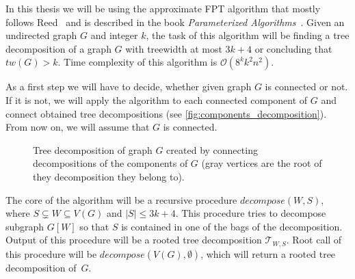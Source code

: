 \documentclass[thesis=B,english]{FITthesis}[2019/03/21]
\begin{document}
In this thesis we will be using the approximate FPT algorithm that mostly follows Reed~\cite{tree_decomposition_algorithm} and is described in the book \emph{Parameterized Algorithms}~\cite[Chap. 7.6.2]{param_algo}. Given an undirected graph $G$ and integer $k$, the task of this algorithm will be finding a tree decomposition of a graph $G$ with treewidth at most $3k+4$ or concluding that $tw(G) > k$. Time complexity of this algorithm is $\mathcal{O}(8^k k^2 n^2)$.

As a first step we will have to decide, whether given graph $G$ is connected or not. If it is not, we will apply the algorithm to each connected component of $G$ and connect obtained tree decompositions (see \autoref{fig:components_decomposition}). From now on, we will assume that $G$ is connected.

\begin{figure}[H]
	\centering
	\hspace{1em}
	\caption[Tree decomposition of a graph $G$ created by connecting decompositions of the components of $G$]{Tree decomposition of graph $G$ created by connecting decompositions of the components of $G$ (gray vertices are the root of they decomposition they belong to).}
	\label{fig:components_decomposition}
\end{figure}

The core of the algorithm will be a recursive procedure $decompose(W,S)$, where $S \subsetneq W \subseteq V(G)$ and $|S| \leq 3k+4$. This procedure tries to decompose subgraph $G[W]$ so that $S$ is contained in one of the bags of the decomposition. Output of this procedure will be a rooted tree decomposition $\mathcal{T}_{W,S}$. Root call of this procedure will be $decompose(V(G), \emptyset)$, which will return a rooted tree decomposition of~$G$.
\newpage
\end{document}
